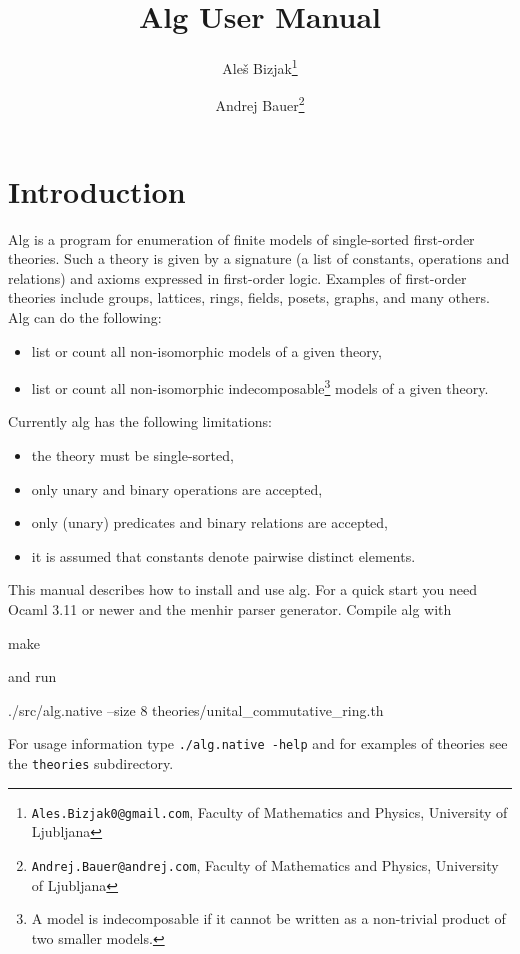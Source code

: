 \documentclass{article}
\begin{document}
\title{Alg User Manual}
\author{Ale\v{s} Bizjak\thanks{\texttt{Ales.Bizjak0@gmail.com},
  Faculty of Mathematics and Physics, University of Ljubljana}
  \and Andrej Bauer\thanks{\texttt{Andrej.Bauer@andrej.com},
    Faculty of Mathematics and Physics, University of Ljubljana}}

\maketitle

\tableofcontents

\section{Introduction}
\label{sec:introduction}

Alg is a program for enumeration of finite models of single-sorted
first-order theories. Such a theory is given by a signature (a list of
constants, operations and relations) and axioms expressed in
first-order logic. Examples of first-order theories include groups,
lattices, rings, fields, posets, graphs, and many others. Alg can do
the following:
%
\begin{itemize}
\item list or count all non-isomorphic models of a given theory,
\item list or count all non-isomorphic indecomposable\footnote{A model
  is indecomposable if it cannot be written as a non-trivial product
  of two smaller models.} models of a given theory.
\end{itemize}
%
Currently alg has the following limitations:
%
\begin{itemize}
\item the theory must be single-sorted,
\item only unary and binary operations are accepted,
\item only (unary) predicates and binary relations are accepted,
\item it is assumed that constants denote pairwise distinct elements.
\end{itemize}
%
This manual describes how to install and use alg. For a quick start
you need Ocaml 3.11 or newer and the menhir parser generator. Compile
alg with
%
\begin{shell}
make
\end{shell}
%
and run
%
\begin{shell}
./src/alg.native --size 8 theories/unital_commutative_ring.th
\end{shell}
%
For usage information type \texttt{./alg.native -help} and for
examples of theories see the \texttt{theories} subdirectory.
\end{document}
